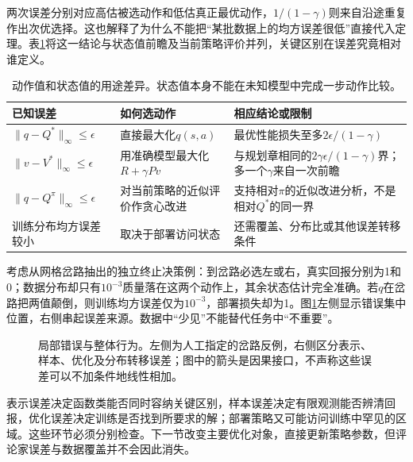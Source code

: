 两次误差分别对应高估被选动作和低估真正最优动作，$1/(1-\gamma)$则来自沿途重复作出次优选择。这也解释了为什么不能把“某批数据上的均方误差很低”直接代入定理。表\ref{tab:rl-learning-value-bounds}将这一结论与状态值前瞻及当前策略评价并列，关键区别在误差究竟相对谁定义。

\begin{table}[t]
  \centering
  \small
  \begin{tabularx}{\linewidth}{>{\raggedright\arraybackslash}p{31mm} >{\raggedright\arraybackslash}X >{\raggedright\arraybackslash}X}
    \toprule
    已知误差 & 如何选动作 & 相应结论或限制 \\
    \midrule
    $\lVert q-Q^*\rVert_\infty\leq\epsilon$ & 直接最大化$q(s,a)$ & 最优性能损失至多$2\epsilon/(1-\gamma)$ \\
    $\lVert v-V^*\rVert_\infty\leq\epsilon$ & 用准确模型最大化$R+\gamma Pv$ & 与规划章相同的$2\gamma\epsilon/(1-\gamma)$界；多一个$\gamma$来自一次前瞻 \\
    $\lVert q-Q^\pi\rVert_\infty\leq\epsilon$ & 对当前策略的近似评价作贪心改进 & 支持相对$\pi$的近似改进分析，不是相对$Q^*$的同一界 \\
    训练分布均方误差较小 & 取决于部署访问状态 & 还需覆盖、分布比或其他误差转移条件 \\
    \bottomrule
  \end{tabularx}
  \caption{动作值和状态值的用途差异。状态值本身不能在未知模型中完成一步动作比较。}
  \label{tab:rl-learning-value-bounds}
\end{table}

考虑从网格岔路抽出的独立终止决策例：到岔路必选左或右，真实回报分别为1和0；数据分布却只有$10^{-3}$质量落在这两个动作上，其余状态估计完全准确。若$q$在岔路把两值颠倒，则训练均方误差仅为$10^{-3}$，部署损失却为1。图\ref{fig:rl-learning-error-flow}左侧显示错误集中位置，右侧串起误差来源。数据中“少见”不能替代任务中“不重要”。

\begin{figure}[t]
  \centering
  
  \caption{局部错误与整体行为。左侧为人工指定的岔路反例，右侧区分表示、样本、优化及分布转移误差；图中的箭头是因果接口，不声称这些误差可以不加条件地线性相加。}
  \label{fig:rl-learning-error-flow}
\end{figure}

表示误差决定函数类能否同时容纳关键区别，样本误差决定有限观测能否辨清回报，优化误差决定训练是否找到所要求的解；部署策略又可能访问训练中罕见的区域。这些环节必须分别检查。下一节改变主要优化对象，直接更新策略参数，但评论家误差与数据覆盖并不会因此消失。

